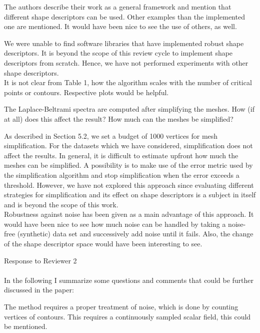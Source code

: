\documentclass[10pt]{article}
\begin{document}
   The authors describe their work as a general framework and mention that
   different shape descriptors can be used. Other examples than the
   implemented one are mentioned. It would have been nice to see the use of
   others, as well. 

   {\color{blue} We were unable to find software libraries that have implemented
	robust shape descriptors. It is beyond the scope of this review cycle
	to implement shape descriptors from scratch. Hence, we have not
performed experiments with other shape descriptors.}\\

   It is not clear from Table 1, how the algorithm scales with the number
   of critical points or contours. Respective plots would be helpful.

   The Laplace-Beltrami spectra are computed after simplifying the meshes.
   How (if at all) does this affect the result? How much can the meshes be
   simplified?

   {\color{blue}As described in Section 5.2, we set a budget of 1000 vertices
	   for mesh simplification. For the datasets which we have considered,
	   simplification does not affect the results. In general, it is difficult
	   to estimate upfront how much the meshes can be simplified. A possibility
	   is to make use of the error metric used by the simplification algorithm
	   and stop simplification when the error exceeds a threshold. However, we have
	   not explored this approach since evaluating different strategies for simplification
	   and its effect on shape descriptors is a subject in itself and is beyond the scope
   of this work.}\\

   Robustness against noise has been given as a main advantage of this
   approach. It would have been nice to see how much noise can be handled by
   taking a noise-free (synthetic) data set and successively add noise until
   it fails. Also, the change of the shape descriptor space would have been
   interesting to see.



{\noindent \LARGE Response to Reviewer 2}\\\\

	In the following I summarize some questions and comments that could be
   further discussed in the paper:

   The method requires a proper treatment of noise, which is done by
   counting vertices of contours. This requires a continuously sampled
   scalar field, this could be mentioned.
\end{document}
